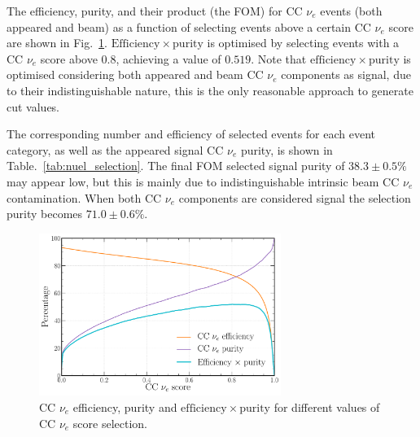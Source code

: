 The efficiency, purity, and their product (the FOM) for CC $\nu_{e}$ events (both appeared and
beam) as a function of selecting events above a certain CC $\nu_{e}$ score are shown in
Fig.~\ref{fig:final_nuel_eff_curves}. $\mathrm{Efficiency}\times\mathrm{purity}$ is optimised by
selecting events with a CC $\nu_{e}$ score above $0.8$, achieving a value of $0.519$. Note that
$\mathrm{efficiency}\times\mathrm{purity}$ is optimised considering both appeared and beam CC
$\nu_{e}$ components as signal, due to their indistinguishable nature, this is the only reasonable
approach to generate cut values.

The corresponding number and efficiency of selected events for each event category, as well as the
appeared signal CC $\nu_{e}$ purity, is shown in Table.~\ref{tab:nuel_selection}. The final FOM
selected signal purity of $38.3\pm0.5\%$ may appear low, but this is mainly due to
indistinguishable intrinsic beam CC $\nu_{e}$ contamination. When both CC $\nu_{e}$ components are
considered signal the selection purity becomes $71.0\pm0.6\%$.

\begin{figure} %
    \includegraphics[width=0.7\textwidth]{diagrams/7-results/final_nuel_eff_curves.pdf}
    \caption[CC $\nu_{e}$ efficiency, purity and $\mathrm{efficiency}\times\mathrm{purity}$]
    {CC $\nu_{e}$ efficiency, purity and $\mathrm{efficiency}\times\mathrm{purity}$ for different
        values of CC $\nu_{e}$ score selection.}
    \label{fig:final_nuel_eff_curves}
\end{figure}

